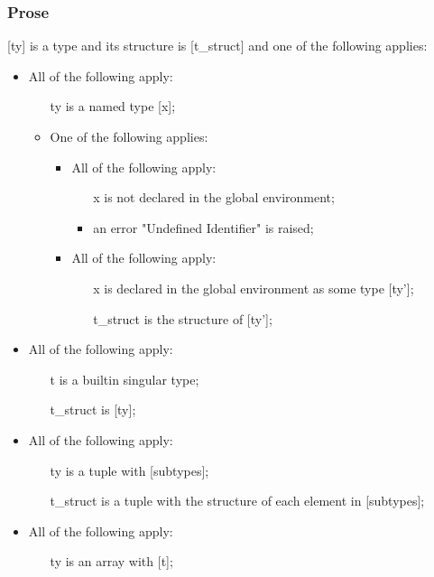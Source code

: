 \documentclass{book}
\begin{document}
    \subsubsection{Prose}
    [ty] is a type and its structure is [t\_struct] and one of the following
    applies:
    \begin{itemize}
    \item  All of the following apply:
      \begin{itemize}
      \item  [ty] is a named type [x];
      \item  One of the following applies:
        \begin{itemize}
        \item  All of the following apply:
          \begin{itemize}
          \item  [x] is not declared in the global environment; 
          \item  an error "Undefined Identifier" is raised;
          \end{itemize}
        \item  All of the following apply:
          \begin{itemize}
          \item  [x] is declared in the global environment as some type [ty'];
          \item  [t\_struct] is the structure of [ty'];
          \end{itemize}
       \end{itemize}
      \end{itemize}
    \item  All of the following apply:
      \begin{itemize}
      \item  [t] is a builtin singular type;
      \item  [t\_struct] is [ty];
      \end{itemize}
    \item  All of the following apply:
      \begin{itemize}
      \item  [ty] is a tuple with [subtypes];
      \item  [t\_struct] is a tuple with the structure of each element in [subtypes];
      \end{itemize}
    \item  All of the following apply:
      \begin{itemize}
      \item  [ty] is an array with [t];

\end{itemize}
\end{itemize}
\end{document}
